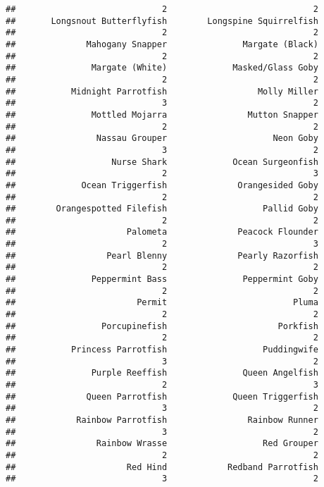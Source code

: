 \documentclass[
]{article}
\begin{document}
\begin{verbatim}
##                             2                             2 
##       Longsnout Butterflyfish        Longspine Squirrelfish 
##                             2                             2 
##              Mahogany Snapper               Margate (Black) 
##                             2                             2 
##               Margate (White)             Masked/Glass Goby 
##                             2                             2 
##           Midnight Parrotfish                  Molly Miller 
##                             3                             2 
##               Mottled Mojarra                Mutton Snapper 
##                             2                             2 
##                Nassau Grouper                     Neon Goby 
##                             3                             2 
##                   Nurse Shark             Ocean Surgeonfish 
##                             2                             3 
##             Ocean Triggerfish              Orangesided Goby 
##                             2                             2 
##        Orangespotted Filefish                   Pallid Goby 
##                             2                             2 
##                      Palometa              Peacock Flounder 
##                             2                             3 
##                  Pearl Blenny              Pearly Razorfish 
##                             2                             2 
##               Peppermint Bass               Peppermint Goby 
##                             2                             2 
##                        Permit                         Pluma 
##                             2                             2 
##                 Porcupinefish                      Porkfish 
##                             2                             2 
##           Princess Parrotfish                   Puddingwife 
##                             3                             2 
##               Purple Reeffish               Queen Angelfish 
##                             2                             3 
##              Queen Parrotfish             Queen Triggerfish 
##                             3                             2 
##            Rainbow Parrotfish                Rainbow Runner 
##                             3                             2 
##                Rainbow Wrasse                   Red Grouper 
##                             2                             2 
##                      Red Hind            Redband Parrotfish 
##                             3                             2 

\end{verbatim}
\end{document}
